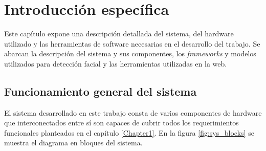 \chapter{Introducción específica} %

\label{Chapter2} %

Este capítulo expone una descripción detallada del sistema, del hardware utilizado y las herramientas de  software necesarias en el desarrollo del trabajo. Se abarcan la descripción del sistema y sus componentes, los \textit{frameworks} y modelos utilizados para detección facial y las herramientas utilizadas en la web.

\section{Funcionamiento general del sistema}
El sistema desarrollado en este trabajo consta de varios componentes de hardware que interconectados entre sí son capaces de cubrir todos los requerimientos funcionales planteados en el capítulo \ref{Chapter1}. En la figura \ref{fig:sys_blocks} se muestra el diagrama en bloques del sistema.

